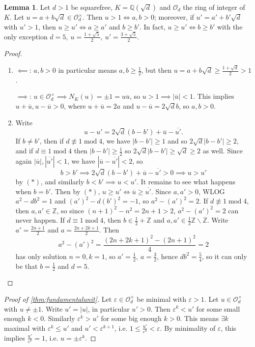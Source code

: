 \documentclass{article}
\newcommand{\Z}{\mathbb{Z}}
\newcommand{\Q}{\mathbb{Q}}
\newcommand{\Mod}{\operatorname{mod}}
\newcommand{\ri}{\mathcal{O}}
\theoremstyle{definition}
\newtheorem{lemma}[defn]{Lemma}
\begin{document}
\begin{lemma}
Let $d>1$ be squarefree, $K=\Q\left(\sqrt d\right)$ and $\ri_d$ the ring of integer of $K$. Let $u=a+b\sqrt d\in\ri_d^\times$. Then $u>1\iff a,b>0$; moreover, if $u'=a'+b'\sqrt d$ with $u'>1$, then $u\geq u'\iff a\geq a'$ and $b\geq b'$. In fact, $u\geq u'\iff b\geq b'$ with the only exception $d=5,\ u=\frac{1+\sqrt 5}{2},\ u'=\frac{3+\sqrt 5}{2}$.
\end{lemma}
\begin{proof}
\begin{enumerate}
\item $\impliedby$: $a,b>0$ in particular means $a,b\geq\frac12$, but then $u=a+b\sqrt d\geq\frac{1+\sqrt d}{2}>1$.

$\implies$: $u\in\ri_d^\times\implies N_K(u)=\pm 1=u\overline u$, so $u>1\implies |\overline u|<1$. This implies $u+\overline u,u-\overline u>0$, where $u+\overline u=2a$ and $u-\overline u=2\sqrt db$, so $a,b>0$.

\item Write
\[
\tag{\ast}
u-u'=2\sqrt d(b-b')+\overline u-\overline{u'}.
\]
If $b\neq b'$, then if $d\nequiv 1\Mod 4$, we have $|b-b'|\geq 1$ and so $2\sqrt d|b-b'|\geq 2$, and if $d\equiv 1\Mod 4$ then $|b-b'|\geq\frac12$ so $2\sqrt d|b-b'|\geq\sqrt d\geq 2$ as well. Since again $|\overline u|,|\overline{u'}|<1$, we have $|\overline u-\overline{u'}|<2$, so
\[
b>b'\implies 2\sqrt d(b-b')+\overline u-\overline{u'}>0\implies u>u'
\]
by $(\ast)$, and similarly $b<b'\implies u<u'$. It remains to see what happens when $b=b'$. Then by $(\ast)$, $u\geq u'\iff \overline{u}\geq\overline{u'}$. Since $a,a'>0$, WLOG $a^2-db^2=1$ and $(a')^2-d(b')^2=-1$, so $a^2-(a')^2=2$. If $d\nequiv 1\Mod 4$, then $a,a'\in\Z$, so since $(n+1)^2-n^2=2n+1>2$, $a^2-(a')^2=2$ can never happen. If $d\equiv 1\Mod 4$, then $b\in\frac12+\Z$ and $a,a'\in\frac12\Z\backslash\Z$. Write $a'=\frac{2n+1}{2}$ and $a=\frac{2n+2k+1}{2}$. Then
\[
a^2-(a')^2=\frac{(2n+2k+1)^2-(2n+1)^2}{4}=2
\]
has only solution $n=0,k=1$, so $a'=\frac12,\ a=\frac32$, hence $db^2=\frac{5}{4}$, so it can only be that $b=\frac12$ and $d=5$.
\end{enumerate}
\end{proof}

\begin{proof}[Proof of \ref{thm:fundamentalunit}]
Let $\varepsilon\in\ri_d^\times$ be minimal with $\varepsilon>1$. Let $u\in\ri_d^\times$ with $u\neq\pm 1$. Write $u'=|u|$, in particular $u'>0$. Then $\varepsilon^k<u'$ for some small enough $k<0$. Similarly $\varepsilon^k>u'$ for some big enough $k>0$. This means $\exists k$ maximal with $\varepsilon^k\leq u'$ and $u'<\varepsilon^{k+1}$, i.e. $1\leq\frac{u'}{\varepsilon^k}<\varepsilon$. By minimality of $\varepsilon$, this implies $\frac{u'}{\varepsilon^k}=1$, i.e. $u=\pm\varepsilon^k$.
\end{proof}
\end{document}
